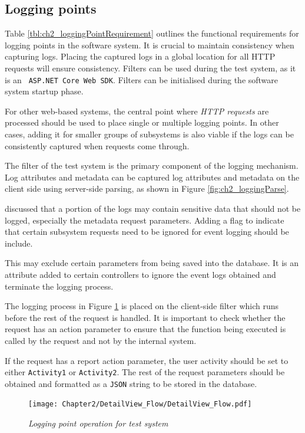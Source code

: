 \subsection{Logging points}
Table \ref{tbl:ch2_loggingPointRequirement} outlines the functional requirements for logging points in the software system. It is crucial to maintain consistency when capturing logs. Placing the captured logs in a global location for all HTTP requests will ensure consistency. Filters can be used during the test system, as it is an \texttt{ ASP.NET Core Web SDK}. Filters can be initialised during the software system startup phase.\par For other web-based systems, the central point where \textit{HTTP requests} are processed should be used to place single or multiple logging points. In other cases, adding it for smaller groups of subsystems is also viable if the logs can be consistently captured when requests come through. \par The filter of the test system is the primary component of the logging mechanism. Log attributes and metadata can be captured log attributes and metadata on the client side using server-side parsing, as shown in Figure \ref{fig:ch2_loggingParse}. \par {} discussed that a portion of the logs may contain sensitive data that should not be logged, especially the metadata request parameters. Adding a flag to indicate that certain subsystem requests need to be ignored for event logging should be include. \par This may exclude certain parameters from being saved into the database. It is an attribute added to certain controllers to ignore the event logs obtained and terminate the logging process. \par The logging process in Figure \ref{fig:ch3_loggingProcess} is placed on the client-side filter which runs before the rest of the request is handled. It is important to check whether the request has an action parameter to ensure that the function being executed is called by the request and not by the internal system. \par If the request has a report action parameter, the user activity should be set to either \texttt{Activity1} or \texttt{Activity2}. The rest of the request parameters should be obtained and formatted as a \texttt{JSON} string to be stored in the database.

\clearpage

\begin{figure}[!htb]
	\centering %
	\texttt{[image: Chapter2/DetailView\_Flow/DetailView\_Flow.pdf]}
	\caption[Logging point operation for test system]
	{\textit{Logging point operation for test system}}\label{fig:ch3_loggingProcess}
\end{figure}

